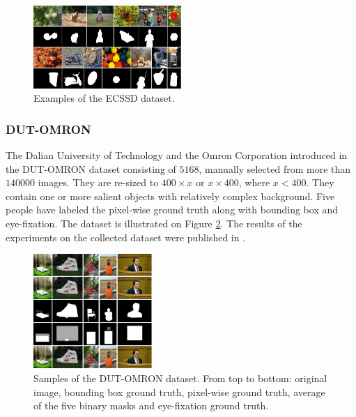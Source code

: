 \begin{figure}[h]
\begin{center}
\includegraphics[width=0.5\textwidth]{fig/ECSSD}
\end{center}
\caption{Examples of the ECSSD dataset.}
\label{fig:ecssd}
\end{figure}

\subsubsection{DUT-OMRON}
The Dalian University of Technology and the Omron Corporation introduced in the DUT-OMRON dataset \cite{dut-omron_db} consisting of $5168$, manually selected from more than $140 000$ images. They are re-sized to $400 \times x$ or $x \times 400$, where  $x < 400$. They contain one or more salient objects with relatively complex background. Five people have labeled the pixel-wise ground truth along with bounding box and eye-fixation. The dataset is illustrated on Figure \ref{fig:dut-omron}. The results of the experiments on the collected dataset were published in \cite{yang2013saliency}.

\begin{figure}[H]
\begin{center}
\includegraphics[width=0.4\textwidth]{fig/DUT-OMRON}
\end{center}
\caption{Samples of the DUT-OMRON dataset. From top to bottom: original image, bounding box ground truth, pixel-wise ground truth, average of the five binary masks and eye-fixation ground truth. }
\label{fig:dut-omron}
\end{figure}

